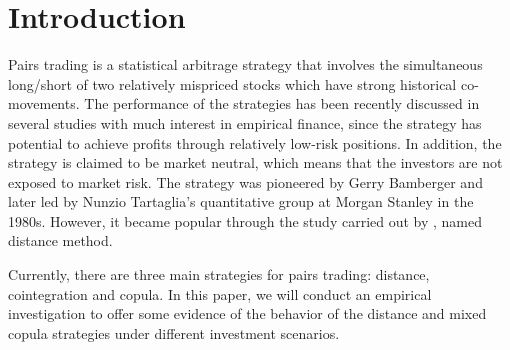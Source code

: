 \documentclass[a4paper]{article}
\begin{document}
	
	
	
	
	\section{Introduction}

	Pairs trading is a statistical arbitrage strategy that involves the simultaneous long/short of two relatively mispriced stocks which have strong historical co-movements. The performance of the strategies has been recently discussed in several studies with much interest in empirical finance, since the strategy has potential to achieve profits through relatively low-risk positions. In addition, the strategy is claimed to be market neutral, which means that the investors are not exposed to market risk. The strategy was pioneered by Gerry Bamberger and later led by Nunzio Tartaglia's quantitative group at Morgan Stanley in the 1980s. However, it became popular through the study carried out by \citet*{ggr06}, named distance method.
	
	Currently, there are three main strategies for pairs trading: distance, cointegration and copula. In this paper, we will conduct an empirical investigation to offer some evidence of the behavior of the distance and mixed copula strategies under different investment scenarios. 
	
\end{document}
